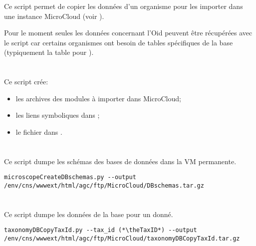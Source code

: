 Ce script permet de copier les données d'un organisme pour les importer dans une instance MicroCloud (voir ).

\begin{warningbox}
    Pour le moment seules les données concernant l'Oid \theOid{} peuvent être récupérées avec le script  car certains organismes ont besoin de tables spécifiques de la base  (typiquement la table  pour \theOrg{}).
\end{warningbox}

\section{}

Ce script crée:
\begin{itemize}
    \item les archives des modules à importer dans MicroCloud;
    \item les liens symboliques dans ;
    \item le fichier  dans .
\end{itemize}

\section{}\label{sec:microscopeCreateDBschemas}

Ce script dumpe les schémas des bases de données dans la VM permanente.

\begin{lstlisting}[style=bash]
microscopeCreateDBschemas.py --output /env/cns/wwwext/html/agc/ftp/MicroCloud/DBschemas.tar.gz
\end{lstlisting}

\section{}

Ce script dumpe les données de la base  pour un  donné.

\begin{lstlisting}[style=bash]
taxonomyDBCopyTaxId.py --tax_id (*\theTaxID*) --output /env/cns/wwwext/html/agc/ftp/MicroCloud/taxonomyDBCopyTaxId.tar.gz
\end{lstlisting}
